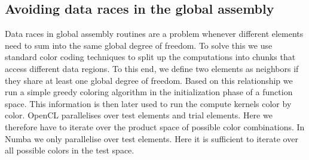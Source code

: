 \subsection{Avoiding data races in the global assembly}

Data races in global assembly routines are a problem whenever different elements need to sum into the same global degree of freedom. To solve this we use standard color coding techniques to split up the computations into chunks that access different data regions. To this end, we define two elements as neighbors if they share at least one global degree of freedom. Based on this relationship we run a simple greedy coloring algorithm in the initialization phase of a function space. This information is then later used to run the compute kernels color by color. OpenCL parallelises over test elements and trial elements. Here we therefore have to iterate over the product space of possible color combinations. In Numba we only parallelise over test elements. Here it is sufficient to iterate over all possible colors in the test space.

